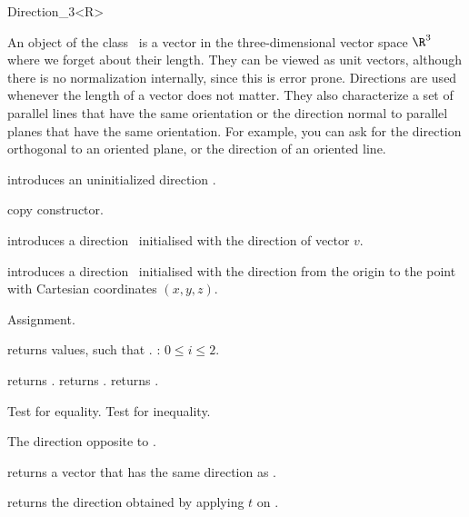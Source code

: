 \begin{ccRefClass}{Direction_3<R>}

\ccDefinition
An object of the class \ccRefName\ is a vector in the three-dimensional 
vector space $\R^3$  where we forget about their length. They can be
viewed as unit vectors, although there is no normalization internally,
since this is error prone.  Directions are used whenever the length of
a vector does not matter. 
They also characterize a set of parallel lines that have the same orientation 
or the direction normal to parallel planes that have the same orientation.
For example, you can ask for the direction
orthogonal to an oriented plane, or the direction of an oriented line.


\ccCreation
{}


\ccHidden {}
             {introduces an uninitialized direction \ccVar.}

\ccHidden {}
 	    {copy constructor.}

	    {introduces a direction \ccVar\ initialised with the 
	     direction of vector $v$.}

            {introduces a direction \ccVar\ initialised with the direction 
	     from the origin to the point with Cartesian coordinates $(x, y, z)$.}


\ccOperations

\ccHidden {}
        {Assignment.}

       {returns values, such that \ccVar {}.
        \ccPrecond: $0 \leq i \leq 2$.}

       {returns .}
\ccGlue
{}
       {returns .}
\ccGlue
{}
       {returns .}


       {Test for equality.}
\ccGlue
{}
       {Test for inequality.}


       {The direction opposite to \ccVar.}

       {returns a vector that has the same direction as \ccVar.}

       {returns the direction obtained by applying $t$ on \ccVar.}



\end{ccRefClass} 

